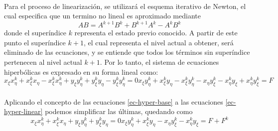 \documentclass[letterpaper, openright, 12pt]{book}
\begin{document}
	\paragraph*{}
		Para el proceso de linearización, se utilizará el esquema iterativo de Newton, el cual especifica que un termino no lineal es aproximado mediante
		\begin{equation}
			AB = A^{k + 1} B^{k} + B^{k + 1} A^{k} - A^{k} B^{k}
		\end{equation}
		donde el superíndice $k$ representa el estado previo conocido. A partir de este punto el superíndice $k + 1$, el cual representa el nivel actual a obtener, será eliminado de las ecuaciones, y se entiende que todos los términos sin superíndice pertenecen al nivel actual $k + 1$. Por lo tanto, el sistema de ecuaciones hiperbólicas es expresado en su forma lineal como:
		\begin{subequations}
			\begin{equation}
				x_{\xi} x_{\eta}^{k} + x_{\xi}^{k} x_{\eta} - x_{\xi}^{k} x_{\eta}^{k} + y_{\xi} y_{\eta}^{k} + y_{\xi}^{k} y_{\eta} - y_{\xi}^{k} y_{\eta}^{k} = 0
			\end{equation}
			\begin{equation}
				x_{\xi} y_{\eta}^{k} + x_{\xi}^{k} y_{\eta} - x_{\xi}^{k} y_{\eta}^{k} - x_{\eta} y_{\xi}^{k} - x_{\eta}^{k} y_{\xi} + x_{\eta}^{k} y_{\xi}^{k} = F
			\end{equation}
			\label{ec-hyper-linear}
		\end{subequations}
		
	\paragraph*{}
		Aplicando el concepto de las ecuaciones \ref{ec-hyper-base} a las ecuaciones \ref{ec-hyper-linear} podemos simplificar las últimas, quedando como
		\begin{subequations}
			\begin{equation}
				x_{\xi} x_{\eta}^{k} + x_{\xi}^{k} x_{\eta} + y_{\xi} y_{\eta}^{k} + y_{\xi}^{k} y_{\eta} = 0
			\end{equation}
			\begin{equation}
				x_{\xi} y_{\eta}^{k} + x_{\xi}^{k} y_{\eta} - x_{\eta} y_{\xi}^{k} - x_{\eta}^{k} y_{\xi} = F + F^{k}
			\end{equation}
			\label{ec-hyper-reducida}
		\end{subequations}
	
\end{document}
